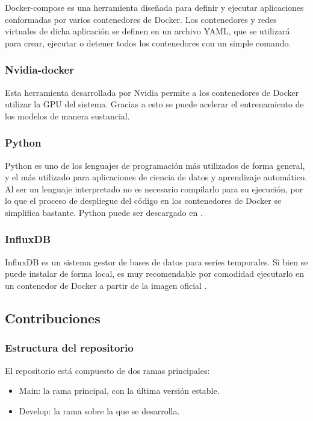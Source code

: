 Docker-compose \cite{compose} es una herramienta diseñada para definir y ejecutar aplicaciones conformadas por varios contenedores
de Docker. Los contenedores y redes virtuales de dicha aplicación se definen en un archivo YAML, que se utilizará 
para crear, ejecutar o detener todos los contenedores con un simple comando.

\subsubsection{Nvidia-docker}

Esta herramienta \cite{nvidia-docker} desarrollada por Nvidia permite a los contenedores de Docker utilizar la GPU del sistema. Gracias
a esto se puede acelerar el entrenamiento de los modelos de manera sustancial.

\subsubsection{Python}

Python es uno de los lenguajes de programación más utilizados de forma general, y el más utilizado para aplicaciones 
de ciencia de datos y aprendizaje automático. Al ser un lenguaje interpretado no es necesario compilarlo para su ejecución, 
por lo que el proceso de despliegue del código en los contenedores de Docker se simplifica bastante.
Python puede ser descargado en \cite{python310}.

\subsubsection{InfluxDB}

InfluxDB es un sistema gestor de bases de datos para series temporales. Si bien se puede instalar de forma local,
es muy recomendable por comodidad ejecutarlo en un contenedor de Docker a partir de la imagen oficial \cite{influx:docker}.

\subsection{Contribuciones}

\subsubsection{Estructura del repositorio}
El repositorio está compuesto de dos ramas principales:
\begin{itemize}
    \item Main: la rama principal, con la última versión estable.
    \item Develop: la rama sobre la que se desarrolla.
\end{itemize}

